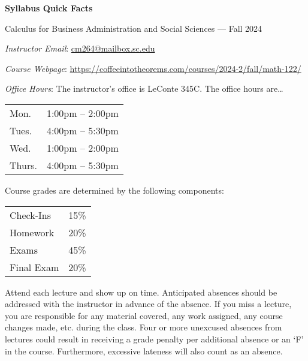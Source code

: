 \documentclass[11pt,letterpaper]{article}
\begin{document}
\begin{center} 
\bfseries
\color{scred}
\LARGE Syllabus Quick Facts \par\vspace{0.2\baselineskip}
\Large Calculus for Business Administration and Social Sciences --- Fall 2024
\end{center} \pspace


\hspace{0.53cm} {\itshape Instructor Email}: \href{mailto:cm264@mailbox.sc.edu}{cm264@mailbox.sc.edu} \par
\hspace{0.53cm} {\itshape Course Webpage}: \href{https://coffeeintotheorems.com/courses/2024-2/fall/math-122/}{https://coffeeintotheorems.com/courses/2024-2/fall/math-122/} \par
\hspace{0.53cm} {\itshape Office Hours}: The instructor's office is LeConte 345C. The office hours are\dots \par \vspace{-0.3cm}
	\begin{table}[!ht]
	\centering
	\begin{tabular}{l || l}
	Mon. & 1:00pm -- 2:00pm \\
	Tues. & 4:00pm -- 5:30pm \\
	Wed. & 1:00pm -- 2:00pm \\
	Thurs. & 4:00pm -- 5:30pm 
	\end{tabular}
	\end{table}


Course grades are determined by the following components: \par \vspace{-0.3cm}
	\begin{table}[!ht]
        \begin{tabular}{lr}
	Check-Ins & 15\% \\
        Homework & 20\% \\
        Exams & 45\% \\
        Final Exam & 20\% \\
        \end{tabular} 
        \end{table}


Attend each lecture and show up on time. Anticipated absences should be addressed with the instructor in advance of the absence. If you miss a lecture, you are responsible for any material covered, any work assigned, any course changes made, etc. during the class. Four or more unexcused absences from lectures could result in receiving a grade penalty per additional absence or an `F' in the course. Furthermore, excessive lateness will also count as an absence. \pspace
\end{document}
